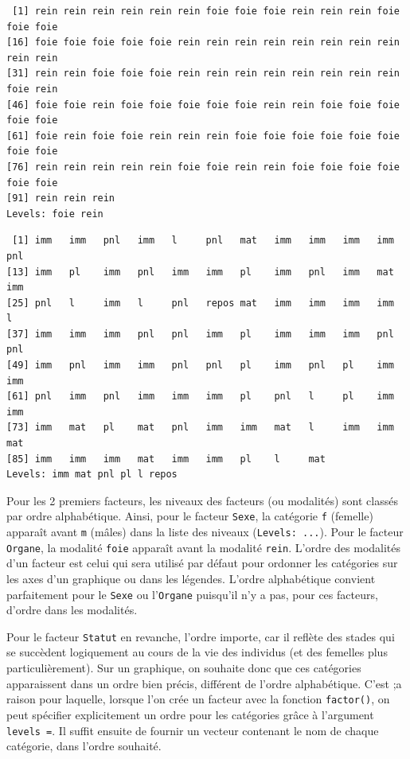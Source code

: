 \documentclass[
  letterpaper,
  DIV=11,
  numbers=noendperiod]{scrreprt}
\newenvironment{Shaded}{\begin{snugshade}}{\end{snugshade}}
\newcommand{\NormalTok}[1]{\textcolor[rgb]{0.00,0.23,0.31}{#1}}
\newcommand{\SpecialCharTok}[1]{\textcolor[rgb]{0.37,0.37,0.37}{#1}}
\begin{document}
\begin{verbatim}
 [1] rein rein rein rein rein rein foie foie foie rein rein rein foie foie foie
[16] foie foie foie foie foie rein rein rein rein rein rein rein rein rein rein
[31] rein rein foie foie foie rein rein rein rein rein rein rein rein foie rein
[46] foie foie rein foie foie foie foie foie rein rein foie foie foie foie foie
[61] foie rein foie foie rein rein rein foie foie foie foie foie foie foie foie
[76] rein rein rein rein rein foie foie rein rein foie foie foie foie foie foie
[91] rein rein rein
Levels: foie rein
\end{verbatim}

\begin{Shaded}
\end{Shaded}

\begin{verbatim}
 [1] imm   imm   pnl   imm   l     pnl   mat   imm   imm   imm   imm   pnl  
[13] imm   pl    imm   pnl   imm   imm   pl    imm   pnl   imm   mat   imm  
[25] pnl   l     imm   l     pnl   repos mat   imm   imm   imm   imm   l    
[37] imm   imm   imm   pnl   pnl   imm   pl    imm   imm   imm   pnl   pnl  
[49] imm   pnl   imm   imm   pnl   pnl   pl    imm   pnl   pl    imm   imm  
[61] pnl   imm   pnl   imm   imm   imm   pl    pnl   l     pl    imm   imm  
[73] imm   mat   pl    mat   pnl   imm   imm   mat   l     imm   imm   mat  
[85] imm   imm   imm   mat   imm   imm   pl    l     mat  
Levels: imm mat pnl pl l repos
\end{verbatim}

Pour les 2 premiers facteurs, les niveaux des facteurs (ou modalités)
sont classés par ordre alphabétique. Ainsi, pour le facteur
\texttt{Sexe}, la catégorie \texttt{f} (femelle) apparaît avant
\texttt{m} (mâles) dans la liste des niveaux (\texttt{Levels:\ ...}).
Pour le facteur \texttt{Organe}, la modalité \texttt{foie} apparaît
avant la modalité \texttt{rein}. L'ordre des modalités d'un facteur est
celui qui sera utilisé par défaut pour ordonner les catégories sur les
axes d'un graphique ou dans les légendes. L'ordre alphabétique convient
parfaitement pour le \texttt{Sexe} ou l'\texttt{Organe} puisqu'il n'y a
pas, pour ces facteurs, d'ordre dans les modalités.

Pour le facteur \texttt{Statut} en revanche, l'ordre importe, car il
reflète des stades qui se succèdent logiquement au cours de la vie des
individus (et des femelles plus particulièrement). Sur un graphique, on
souhaite donc que ces catégories apparaissent dans un ordre bien précis,
différent de l'ordre alphabétique. C'est ;a raison pour laquelle,
lorsque l'on crée un facteur avec la fonction \texttt{factor()}, on peut
spécifier explicitement un ordre pour les catégories grâce à l'argument
\texttt{levels\ =}. Il suffit ensuite de fournir un vecteur contenant le
nom de chaque catégorie, dans l'ordre souhaité.
\end{document}
